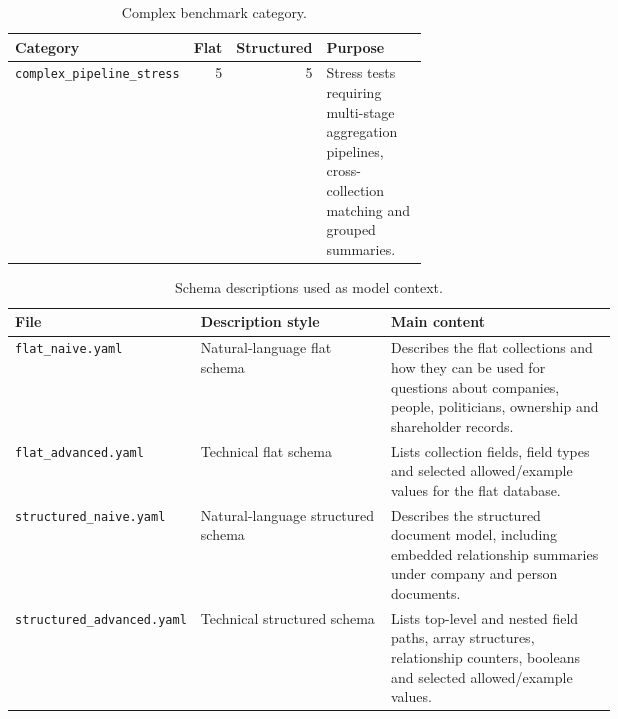 \begin{table}[htbp]
\centering
\small
\caption{Complex benchmark category.}
\label{tab:appendix-complex-benchmark-category}
\begin{tabular}{lrrp{0.48\linewidth}}
\toprule
Category & Flat & Structured & Purpose \\
\midrule
\texttt{complex\_pipeline\_stress} & 5 & 5 & Stress tests requiring multi-stage aggregation pipelines, cross-collection matching and grouped summaries. \\
\bottomrule
\end{tabular}
\end{table}

\begin{table}[htbp]
\centering
\small
\caption{Schema descriptions used as model context.}
\label{tab:appendix-schema-descriptions}
\begin{tabular}{lp{0.32\linewidth}p{0.38\linewidth}}
\toprule
File & Description style & Main content \\
\midrule
\texttt{flat\_naive.yaml} & Natural-language flat schema & Describes the flat collections and how they can be used for questions about companies, people, politicians, ownership and shareholder records. \\
\texttt{flat\_advanced.yaml} & Technical flat schema & Lists collection fields, field types and selected allowed/example values for the flat database. \\
\texttt{structured\_naive.yaml} & Natural-language structured schema & Describes the structured document model, including embedded relationship summaries under company and person documents. \\
\texttt{structured\_advanced.yaml} & Technical structured schema & Lists top-level and nested field paths, array structures, relationship counters, booleans and selected allowed/example values. \\
\bottomrule
\end{tabular}
\end{table}

